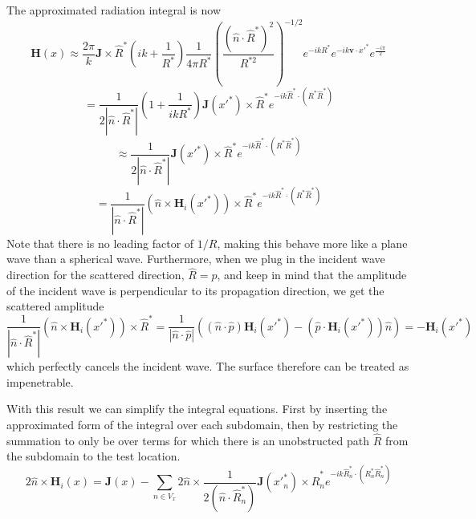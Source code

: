 \documentclass{article}
\newcommand{\abs}[1]{\left\lvert #1 \right\rvert}
\theoremstyle{plain}
\begin{document}
The approximated radiation integral is now 
\begin{equation}
	\mathbf{H}(x) \approx
	\frac{2\pi}{k}
	\mathbf{J} \times \hat{R}^*
	\left( ik + \frac{1}{R^*} \right)
	\frac{1}{4\pi R^*}
	\left( \frac{\left(\hat{n}\cdot\hat{R}^*\right)^2}{R^{*2}} \right)^{-1/2}
	e^{-ikR^*}
	e^{-ik\mathbf{v}\cdot x'^{*}}
	e^{\frac{-i\pi}{2}}
\end{equation}
\begin{equation}
	=
	\frac{1}{2\abs{\hat{n}\cdot\hat{R}^*}}
	\left( 1 + \frac{1}{ikR^*} \right)
	\mathbf{J}(x'^{*}) \times \hat{R}^*
	e^{-ik\hat{R}^*\cdot (R^*\hat{R}^*)}
\end{equation}
\begin{equation}
	\approx
	\frac{1}{2\abs{\hat{n}\cdot\hat{R}^*}}
	\mathbf{J}(x'^{*}) \times \hat{R}^*
	e^{-ik\hat{R}^*\cdot (R^*\hat{R}^*)}
\end{equation}
\begin{equation}
	=
	\frac{1}{\abs{\hat{n}\cdot\hat{R}^*}}
	\left( \hat{n} \times \mathbf{H}_i(x'^{*}) \right) \times \hat{R}^*
	e^{-ik\hat{R}^*\cdot (R^*\hat{R}^*)}
\end{equation}
Note that there is no leading factor of $1/R$,
making this behave more like a plane wave than a spherical wave.
Furthermore, when we plug in the incident wave direction for the scattered direction, 
$\hat{R}=\hat{p}$, 
and keep in mind that the amplitude of the incident wave is perpendicular to its propagation direction,
we get the scattered amplitude
\begin{equation}
	\frac{1}{\abs{\hat{n}\cdot\hat{R}^*}}
	\left( \hat{n} \times \mathbf{H}_i(x'^{*}) \right) \times \hat{R}^*
	=
	\frac{1}{\abs{\hat{n}\cdot\hat{p}}}
	\left( \left(\hat{n}\cdot\hat{p}\right)\mathbf{H}_i(x'^{*}) - \left( \hat{p}\cdot\mathbf{H}_i(x'^{*}) \right)\hat{n} \right)
	= -\mathbf{H}_i(x'^{*})
\end{equation}
which perfectly cancels the incident wave.
The surface therefore can be treated as impenetrable.


With this result we can simplify the integral equations.
First by inserting the approximated form of the integral over each subdomain,
then by restricting the summation to only be over terms for which there is an
unobstructed path $\hat{R}$ from the subdomain to the test location.
\begin{equation}
	2\hat{n}\times\mathbf{H}_i(x)
	= \mathbf{J}(x)
	- \sum_{n\in V_x} 2\hat{n}\times
	\frac{1}{2\left(\hat{n}\cdot\hat{R}^*_n\right)}
	\mathbf{J}(x'^{*}_n) \times \hat{R}^*_n
	e^{-ik\hat{R}^*_n\cdot (R^*_n\hat{R}^*_n)}
\end{equation}
\end{document}

